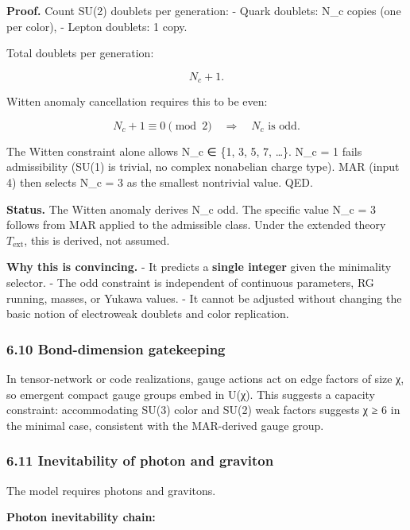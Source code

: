 \documentclass[
]{article}
\begin{document}
\textbf{Proof.} Count SU(2) doublets per generation: - Quark doublets:
N\_c copies (one per color), - Lepton doublets: 1 copy.

Total doublets per generation:

\[
N_c + 1.
\]

Witten anomaly cancellation requires this to be even:

\[
N_c + 1 \equiv 0 \pmod{2} \quad \Rightarrow \quad N_c \text{ is odd}.
\]

The Witten constraint alone allows N\_c ∈ \{1, 3, 5, 7, \ldots\}. N\_c =
1 fails admissibility (SU(1) is trivial, no complex nonabelian charge
type). MAR (input 4) then selects N\_c = 3 as the smallest nontrivial
value. QED.

\textbf{Status.} The Witten anomaly derives N\_c odd. The specific value
N\_c = 3 follows from MAR applied to the admissible class. Under the
extended theory \(T_{\mathrm{ext}}\), this is derived, not assumed.

\textbf{Why this is convincing.} - It predicts a \textbf{single integer}
given the minimality selector. - The odd constraint is independent of
continuous parameters, RG running, masses, or Yukawa values. - It cannot
be adjusted without changing the basic notion of electroweak doublets
and color replication.

\subsubsection{6.10 Bond-dimension
gatekeeping}\label{bond-dimension-gatekeeping}

In tensor-network or code realizations, gauge actions act on edge
factors of size χ, so emergent compact gauge groups embed in U(χ). This
suggests a capacity constraint: accommodating SU(3) color and SU(2) weak
factors suggests χ ≥ 6 in the minimal case, consistent with the
MAR-derived gauge group.

\subsubsection{6.11 Inevitability of photon and
graviton}\label{inevitability-of-photon-and-graviton}

The model requires photons and gravitons.

\textbf{Photon inevitability chain:}
\end{document}
